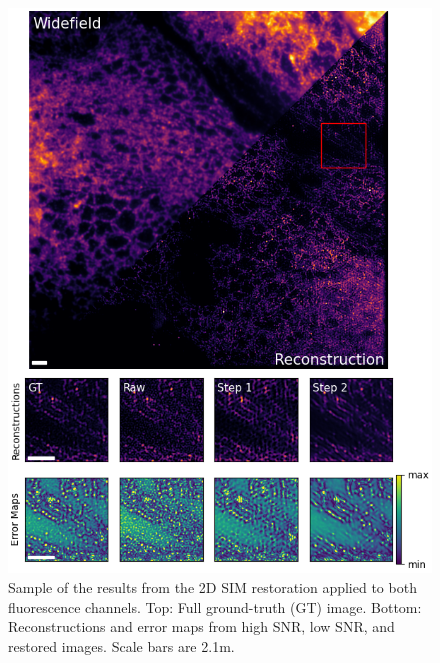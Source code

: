 \documentclass[12pt]{article}
\begin{document}
\begin{figure}[hbtp]
    \includegraphics[scale=1.05, center]{figures/mt_0_016_error.png}
    \caption{Sample of the results from the 2D SIM restoration applied to both fluorescence channels.
    Top: Full ground-truth (GT) image. Bottom: Reconstructions and error maps from high SNR, low SNR, and restored images.
    Scale bars are 2.1\textmu m.}
    \label{fig:er_samples}
\end{figure}
\end{document}
